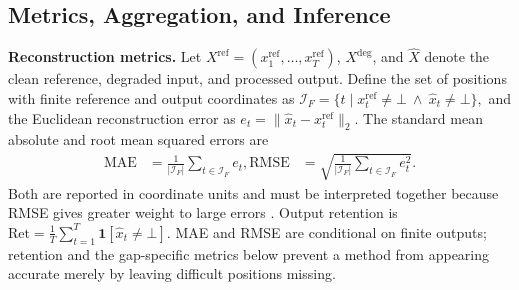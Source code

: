 \documentclass[sigconf,review]{acmart}
\begin{document}
\subsection{Metrics, Aggregation, and Inference}

\textbf{Reconstruction metrics.} Let $X^{\mathrm{ref}}=(x^{\mathrm{ref}}_1,\ldots,x^{\mathrm{ref}}_T)$, $X^{\mathrm{deg}}$, and $\widehat X$ denote the clean reference, degraded input, and processed output. Define the set of positions with finite reference and output coordinates as
\(
\mathcal I_F=\{t\mid x_t^{\mathrm{ref}}\neq\bot\ \land\ \widehat x_t\neq\bot\},
\)
and the Euclidean reconstruction error as $e_t=\lVert\widehat x_t-x_t^{\mathrm{ref}}\rVert_2$. The standard mean absolute and root mean squared errors are
\begin{align*}
\mathrm{MAE}
&= \frac{1}{|\mathcal I_F|}\sum_{t\in\mathcal I_F} e_t, 
\mathrm{RMSE}
&= \sqrt{\frac{1}{|\mathcal I_F|}\sum_{t\in\mathcal I_F} e_t^2}.
\end{align*}
Both are reported in coordinate units and must be interpreted together because RMSE gives greater weight to large errors \cite{chai2014rmse}. Output retention is
\(
\mathrm{Ret}=\frac{1}{T}\sum_{t=1}^{T}\mathbf 1[\widehat x_t\neq\bot].
\)
MAE and RMSE are conditional on finite outputs; retention and the gap-specific metrics below prevent a method from appearing accurate merely by leaving difficult positions missing.
\end{document}
